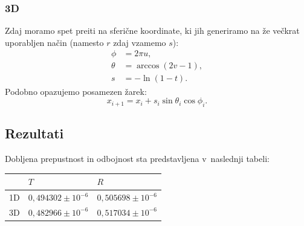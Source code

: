 \documentclass[a4paper,pdftex,10pt]{article}
\numberwithin{figure}{section} %
\begin{document}
\subsubsection*{3D}
Zdaj moramo spet preiti na sferične koordinate, ki jih generiramo na že večkrat uporabljen
način (namesto $r$ zdaj vzamemo $s$):
\begin{align}
    \phi &= 2 \pi u, \\
    \theta &= \arccos(2v-1), \\
    s &= - \ln (1-t).
\end{align}
Podobno opazujemo posamezen žarek:
\begin{equation}
    x_{i+1} = x_i + s_i \sin\theta_i \cos\phi_i.
\end{equation}

\subsection{Rezultati}
Dobljena prepustnost in odbojnost sta predstavljena v~naslednji tabeli:

\begin{tabularx}{\textwidth}{ |c|X|X| }
    \hline
    \quad & $T$ & $R$ \\
    \hline
    1D & $0,494302 \pm 10^{-6}$  & $0,505698 \pm 10^{-6}$ \\
    \hline
    3D & $0,482966 \pm 10^{-6}$  & $0,517034 \pm 10^{-6}$ \\
    \hline
\end{tabularx}
\end{document}
